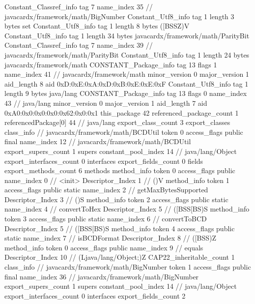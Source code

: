 {{{		}
		Constant_Classref_info {
			tag	7
			name_index	35		// javacardx/framework/math/BigNumber
		}
		Constant_Utf8_info {
			tag	1
			length	3
			bytes	set
		}
		Constant_Utf8_info {
			tag	1
			length	8
			bytes	([BSSZ)V
		}
		Constant_Utf8_info {
			tag	1
			length	34
			bytes	javacardx/framework/math/ParityBit
		}
		Constant_Classref_info {
			tag	7
			name_index	39		// javacardx/framework/math/ParityBit
		}
		Constant_Utf8_info {
			tag	1
			length	24
			bytes	javacardx/framework/math
		}
		CONSTANT_Package_info {
			tag	13
			flags	1
			name_index	41		// javacardx/framework/math
			minor_version	0
			major_version	1
			aid_length	8
			aid	0xD:0xE:0xA:0xD:0xB:0xE:0xE:0xF
		}
		Constant_Utf8_info {
			tag	1
			length	9
			bytes	java/lang
		}
		CONSTANT_Package_info {
			tag	13
			flags	0
			name_index	43		// java/lang
			minor_version	0
			major_version	1
			aid_length	7
			aid	0xA0:0x0:0x0:0x0:0x62:0x0:0x1
		}
	}
	this_package	42
	referenced_package_count	1
	referencedPackage[0]	44		// java/lang
	export_class_count	3
	export_classes {
		class_info {		// javacardx/framework/math/BCDUtil
			token	0
			access_flags	public final
			name_index	12		// javacardx/framework/math/BCDUtil
			export_supers_count	1
			supers {
				constant_pool_index	14		// java/lang/Object
			}
			export_interfaces_count	0
			interfaces {
			}
			export_fields_count	0
			fields {
			}
			export_methods_count	6
			methods {
				method_info {
					token	0
					access_flags	public
					name_index	0		// <init>
					Descriptor_Index	1		// ()V
				}
				method_info {
					token	1
					access_flags	public static
					name_index	2		// getMaxBytesSupported
					Descriptor_Index	3		// ()S
				}
				method_info {
					token	2
					access_flags	public static
					name_index	4		// convertToHex
					Descriptor_Index	5		// ([BSS[BS)S
				}
				method_info {
					token	3
					access_flags	public static
					name_index	6		// convertToBCD
					Descriptor_Index	5		// ([BSS[BS)S
				}
				method_info {
					token	4
					access_flags	public static
					name_index	7		// isBCDFormat
					Descriptor_Index	8		// ([BSS)Z
				}
				method_info {
					token	0
					access_flags	public
					name_index	9		// equals
					Descriptor_Index	10		// (Ljava/lang/Object;)Z
				}
			}
			CAP22_inheritable_count	1
		}
		class_info {		// javacardx/framework/math/BigNumber
			token	1
			access_flags	public final
			name_index	36		// javacardx/framework/math/BigNumber
			export_supers_count	1
			supers {
				constant_pool_index	14		// java/lang/Object
			}
			export_interfaces_count	0
			interfaces {
			}
			export_fields_count	2
}}}
